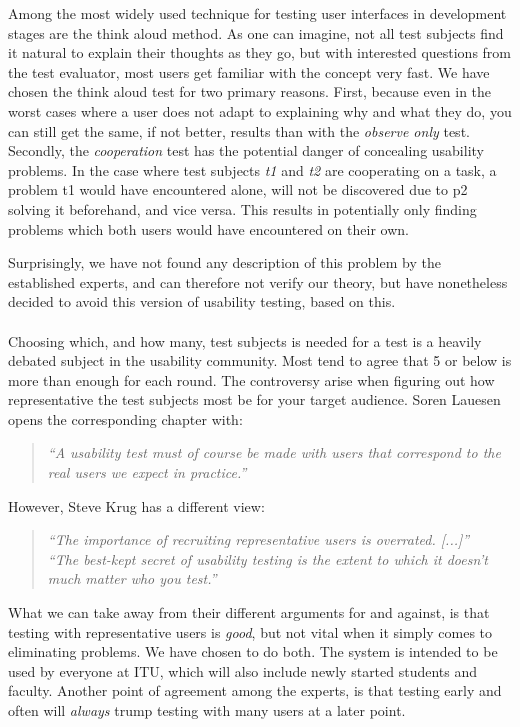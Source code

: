 Among the most widely used technique for testing user interfaces in development stages are the think aloud method.\cite{steve} As one can imagine, not all test subjects find it natural to explain their thoughts as they go, but with interested questions from the test evaluator, most users get familiar with the concept very fast. We have chosen the think aloud test for two primary reasons.
First, because even in the worst cases where a user does not adapt to explaining why and what they do, you can still get the same, if not better, results than with the \emph{observe only} test.
Secondly, the \emph{cooperation} test has the potential danger of concealing usability problems. In the case where test subjects \emph{t1} and \emph{t2} are cooperating on a task, a problem t1 would have encountered alone, will not be discovered due to p2 solving it beforehand, and vice versa. This results in potentially only finding problems which both users would have encountered on their own.

Surprisingly, we have not found any description of this problem by the established experts, and can therefore not verify our theory, but have nonetheless decided to avoid this version of usability testing, based on this. \\
\\
Choosing which, and how many, test subjects is needed for a test is a heavily debated subject in the usability community. Most tend to agree that 5 or below is more than enough for each round. The controversy arise when figuring out how representative the test subjects most be for your target audience. Soren Lauesen opens the corresponding chapter with: \cite{lauesen}
\begin{quotation}
\noindent \emph{``A usability test must of course be made with users that correspond to the real users we expect in practice.''}
\end{quotation}
However, Steve Krug has a different view: \cite{steve}
\begin{quotation}
\noindent \emph{``The importance of recruiting representative users is overrated. [...]''} \\
\noindent \emph{``The best-kept secret of usability testing is the extent to which it doesn't much matter who you test.''}
\end{quotation}

What we can take away from their different arguments for and against, is that testing with representative users is \emph{good}, but not vital when it simply comes to eliminating problems.
We have chosen to do both. The system is intended to be used by everyone at ITU, which will also include newly started students and faculty.
Another point of agreement among the experts, is that testing early and often will \emph{always} trump testing with many users at a later point. \cite{lauesen,steve,nielsen_five_users}

